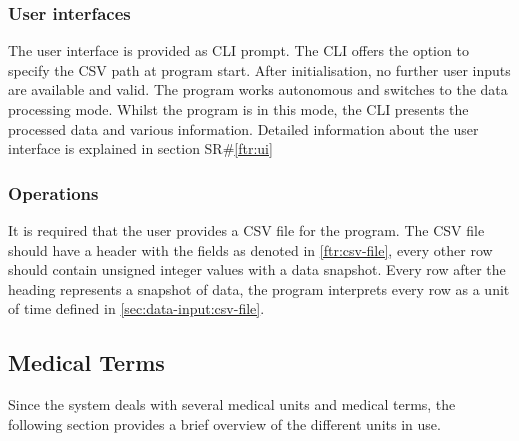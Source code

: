 \documentclass[a4paper]{article}
\begin{document}
\subsubsection{User interfaces}
The user interface is provided as CLI prompt. The CLI offers the option to specify the CSV path at program start. After initialisation, no further user inputs are available and valid. The program works autonomous and switches to the data processing mode. Whilst the program is in this mode, the CLI presents the processed data and various information. Detailed information about the user interface is explained in section SR\#\ref{ftr:ui}

\subsubsection{Operations}
It is required that the user provides a CSV file for the program. The CSV file should have a header with the fields as denoted in \ref{ftr:csv-file}, every other row should contain unsigned integer values with a data snapshot. Every row after the heading represents a snapshot of data, the program interprets every row as a unit of time defined in \ref{sec:data-input:csv-file}.


\clearpage
\subsection{Medical Terms}
Since the system deals with several medical units and medical terms, the following section provides a brief overview of the different units in use.
\end{document}
